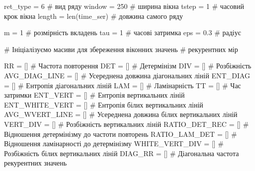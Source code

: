 \documentclass[
  letterpaper,
]{report}
\newenvironment{Shaded}{\begin{snugshade}}{\end{snugshade}}
\newcommand{\BuiltInTok}[1]{\textcolor[rgb]{0.00,0.23,0.31}{#1}}
\newcommand{\CommentTok}[1]{\textcolor[rgb]{0.37,0.37,0.37}{#1}}
\newcommand{\DecValTok}[1]{\textcolor[rgb]{0.68,0.00,0.00}{#1}}
\newcommand{\FloatTok}[1]{\textcolor[rgb]{0.68,0.00,0.00}{#1}}
\newcommand{\NormalTok}[1]{\textcolor[rgb]{0.00,0.23,0.31}{#1}}
\newcommand{\OperatorTok}[1]{\textcolor[rgb]{0.37,0.37,0.37}{#1}}
\begin{document}
\begin{Shaded}
\begin{Highlighting}[]
\NormalTok{ret\_type }\OperatorTok{=} \DecValTok{6}            \CommentTok{\# вид ряду}
\NormalTok{window }\OperatorTok{=} \DecValTok{250}            \CommentTok{\# ширина вікна}
\NormalTok{tstep }\OperatorTok{=} \DecValTok{1}               \CommentTok{\# часовий крок вікна }
\NormalTok{length }\OperatorTok{=} \BuiltInTok{len}\NormalTok{(time\_ser)  }\CommentTok{\# довжина самого ряду}

\NormalTok{m }\OperatorTok{=} \DecValTok{1}                   \CommentTok{\# розмірність вкладень}
\NormalTok{tau }\OperatorTok{=} \DecValTok{1}                 \CommentTok{\# часові затримка}
\NormalTok{eps }\OperatorTok{=} \FloatTok{0.3}               \CommentTok{\# радіус}

                        \CommentTok{\# Ініціалізуємо масиви для збереження віконних значень }
                        \CommentTok{\# рекурентних мір}

\NormalTok{RR }\OperatorTok{=}\NormalTok{ []                 }\CommentTok{\# Частота повторення}
\NormalTok{DET }\OperatorTok{=}\NormalTok{ []                }\CommentTok{\# Детермінізм}
\NormalTok{DIV }\OperatorTok{=}\NormalTok{ []                }\CommentTok{\# Розбіжність}
\NormalTok{AVG\_DIAG\_LINE }\OperatorTok{=}\NormalTok{ []      }\CommentTok{\# Усереднена довжина діагональних ліній}
\NormalTok{ENT\_DIAG }\OperatorTok{=}\NormalTok{ []           }\CommentTok{\# Ентропія діагональних ліній}
\NormalTok{LAM }\OperatorTok{=}\NormalTok{ []                }\CommentTok{\# Ламінарність}
\NormalTok{TT }\OperatorTok{=}\NormalTok{ []                 }\CommentTok{\# Час затримки}
\NormalTok{ENT\_VERT }\OperatorTok{=}\NormalTok{ []           }\CommentTok{\# Ентропія вертикальних ліній}
\NormalTok{ENT\_WHITE\_VERT }\OperatorTok{=}\NormalTok{ []     }\CommentTok{\# Ентропія білих вертикальних ліній}
\NormalTok{AVG\_WVERT\_LINE }\OperatorTok{=}\NormalTok{ []     }\CommentTok{\# Усереднена довжина білих вертикальних ліній}
\NormalTok{VERT\_DIV }\OperatorTok{=}\NormalTok{ []           }\CommentTok{\# Розбіжність вертикальних ліній}
\NormalTok{RATIO\_DET\_REC }\OperatorTok{=}\NormalTok{ []      }\CommentTok{\# Відношення детермінізму до частоти повторень}
\NormalTok{RATIO\_LAM\_DET }\OperatorTok{=}\NormalTok{ []      }\CommentTok{\# Відношення ламінарності до детермінізму}
\NormalTok{WHITE\_VERT\_DIV }\OperatorTok{=}\NormalTok{ []     }\CommentTok{\# Розбіжність білих вертикальних ліній}
\NormalTok{DIAG\_RR }\OperatorTok{=}\NormalTok{ []            }\CommentTok{\# Діагональна частота рекурентних значень}
\end{Highlighting}
\end{Shaded}
\end{document}
